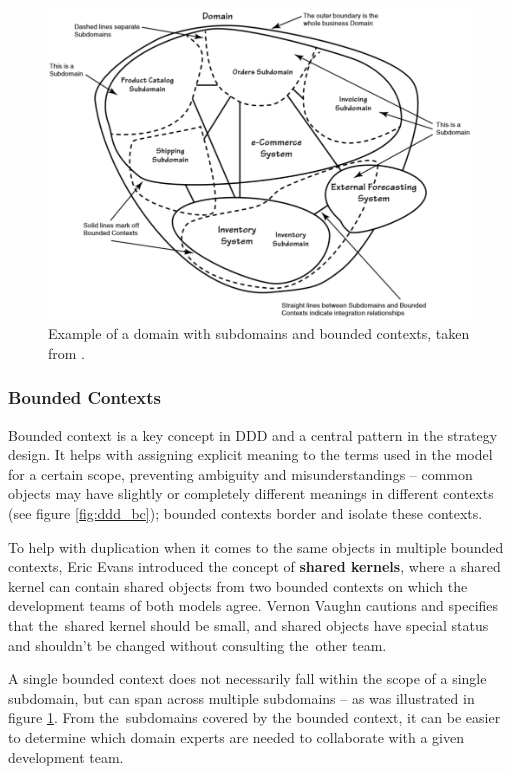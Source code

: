 \begin{figure} [H]
    \centering
    \includegraphics[width=1\textwidth]{figures/ddd-domain-sd-bc.png}
    \caption{Example of a domain with subdomains and bounded contexts, taken from \cite{vv:impl_ddd}.}
    \label{fig:ddd_domain_sd_bc}
\end{figure}

\subsubsection{Bounded Contexts}
Bounded context is a key concept in DDD and a central pattern in the strategy design. It helps with assigning explicit meaning to the terms used in the model for a certain scope, preventing ambiguity and misunderstandings -- common objects may have slightly or completely different meanings in different contexts (see figure \ref{fig:ddd_bc}); bounded contexts border and isolate these contexts. 

To help with duplication when it comes to the same objects in multiple bounded contexts, Eric Evans \cite{eric_evans:ddd} introduced the concept of \textbf{shared kernels}, where a shared kernel can contain shared objects from two bounded contexts on which the development teams of both models agree. Vernon Vaughn \cite{vv:impl_ddd} cautions and specifies that the~shared kernel should be small, and shared objects have special status and shouldn't be changed without consulting the~other team.

A single bounded context does not necessarily fall within the scope of a single subdomain, but can span across multiple subdomains -- as was illustrated in figure \ref{fig:ddd_domain_sd_bc}. From the~subdomains covered by the bounded context, it can be easier to determine which domain experts are needed to collaborate with a given development team.

